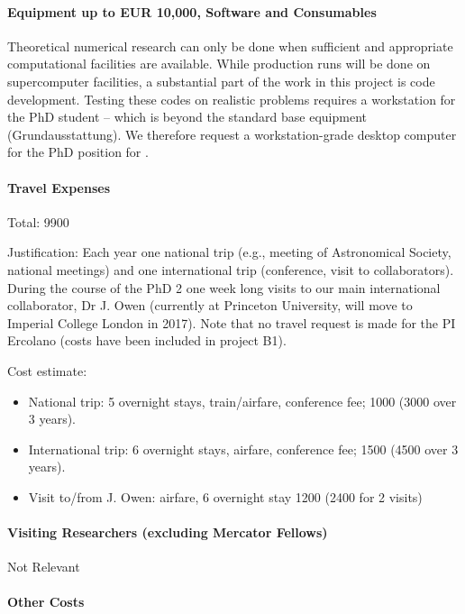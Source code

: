 \documentclass[10pt,fleqn,twoside]{article}
\begin{document}
\paragraph{Equipment up to EUR 10,000, Software and Consumables}


Theoretical numerical research can only be done when sufficient and
appropriate computational facilities are available. While production
runs will be done on supercomputer facilities, a substantial part of
the work in this project is code development. Testing these codes on
realistic problems requires a workstation for the PhD
student -- which is beyond the standard base equipment
(Grundausstattung). We therefore request a workstation-grade desktop
computer for the PhD position for .

\paragraph{Travel Expenses}

Total: 9900 \EUR{}

Justification: Each year one national trip (e.g., meeting of
Astronomical Society, national meetings) and one international trip
(conference, visit to collaborators). During the course of the PhD 2
one week long visits to our main international collaborator, Dr J.
Owen (currently at Princeton University, will move to Imperial College
London in 2017). Note that no travel request is made for the PI
Ercolano (costs have been included in project B1).


Cost estimate: 
\begin{itemize}
\item National trip: 5 overnight stays, train/airfare,
conference fee; 1000 \EUR{} (3000 over 3 years).
\item International trip: 6 overnight stays, airfare, conference fee;
  1500 \EUR{} (4500 over 3 years).
\item Visit to/from J. Owen: airfare, 6 overnight stay 1200 \EUR{} (2400
  for 2 visits)
\end{itemize}


\paragraph{Visiting Researchers (excluding Mercator Fellows)}

Not Relevant

\paragraph{Other Costs}
\end{document}
